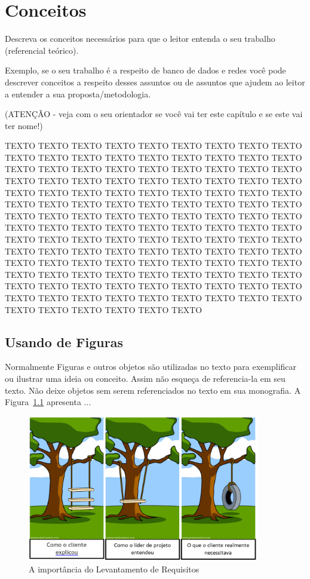 \chapter{Conceitos}
\label{cap:conceitos}

Descreva os conceitos necessários para que o leitor entenda o seu trabalho (referencial teórico). 

Exemplo, se o seu trabalho é a respeito de banco de dados e redes você pode descrever conceitos a respeito desses assuntos ou de assuntos que ajudem ao leitor a entender a sua proposta/metodologia.

(ATENÇÃO - veja com o seu orientador se você vai ter este capítulo e se este vai ter nome!)

TEXTO TEXTO TEXTO TEXTO TEXTO TEXTO TEXTO TEXTO TEXTO TEXTO TEXTO TEXTO TEXTO TEXTO TEXTO TEXTO TEXTO TEXTO TEXTO TEXTO TEXTO TEXTO TEXTO TEXTO TEXTO TEXTO TEXTO TEXTO TEXTO TEXTO TEXTO TEXTO TEXTO TEXTO TEXTO TEXTO TEXTO TEXTO TEXTO TEXTO TEXTO TEXTO TEXTO TEXTO TEXTO TEXTO TEXTO TEXTO TEXTO TEXTO TEXTO TEXTO TEXTO TEXTO TEXTO TEXTO TEXTO TEXTO TEXTO TEXTO TEXTO TEXTO TEXTO TEXTO TEXTO TEXTO TEXTO TEXTO TEXTO TEXTO TEXTO TEXTO TEXTO TEXTO TEXTO TEXTO TEXTO TEXTO TEXTO TEXTO TEXTO TEXTO TEXTO TEXTO TEXTO TEXTO TEXTO TEXTO TEXTO TEXTO TEXTO TEXTO TEXTO TEXTO TEXTO TEXTO TEXTO TEXTO TEXTO TEXTO TEXTO TEXTO TEXTO TEXTO TEXTO TEXTO TEXTO TEXTO TEXTO TEXTO TEXTO TEXTO TEXTO TEXTO TEXTO TEXTO TEXTO TEXTO TEXTO TEXTO TEXTO TEXTO TEXTO TEXTO TEXTO TEXTO TEXTO TEXTO TEXTO TEXTO TEXTO TEXTO

\section{Usando de Figuras}
\label{cap:conceitos:sec:usando:figuras}

Normalmente Figuras e outros objetos são utilizadas no texto para exemplificar ou ilustrar uma ideia ou conceito. Assim não esqueça de referencia-la em seu texto. Não deixe objetos sem serem referenciados no texto em sua monografia. A Figura~\ref{fig:levantamento:requisitos} apresenta ...

\begin{figure}[!htb]
    \centering
    \includegraphics[width=0.90\textwidth]{figuras/The-Project-Cartoon-Beta.png}
    \caption{A importância do Levantamento de Requisitos}
    \label{fig:levantamento:requisitos}
\end{figure}

